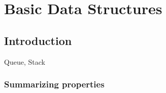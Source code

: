 \chapter{Basic Data Structures}


\section{Introduction}
Queue, Stack


\subsection{Summarizing properties}


